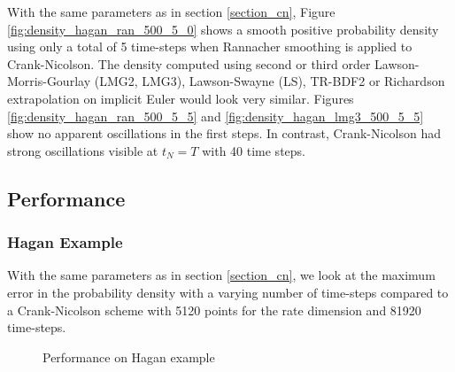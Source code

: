 \documentclass[]{rAMF2e}
\begin{document}
With the same parameters as in section \ref{section_cn}, Figure \ref{fig:density_hagan_ran_500_5_0} shows a smooth positive probability density using only a total of 5 time-steps when Rannacher smoothing is applied to Crank-Nicolson. The density computed using second or third order Lawson-Morris-Gourlay (LMG2, LMG3), Lawson-Swayne (LS), TR-BDF2 or Richardson extrapolation on implicit Euler would look very similar. Figures \ref{fig:density_hagan_ran_500_5_5} and \ref{fig:density_hagan_lmg3_500_5_5} show no apparent oscillations in the first steps.
In contrast, Crank-Nicolson had strong oscillations visible at $t_N=T$ with 40 time steps.

\subsection{Performance}
\subsubsection{Hagan Example}
With the same parameters as in section \ref{section_cn}, we look at the maximum error in the probability density with a varying number of time-steps compared to a Crank-Nicolson scheme with 5120 points for the rate dimension and 81920 time-steps. 

\begin{figure}[htb]
  \begin{center}  
    \end{center}
     \caption{\label{fig:perf_hagan_500} Performance on Hagan example}
\end{figure}
\end{document}
